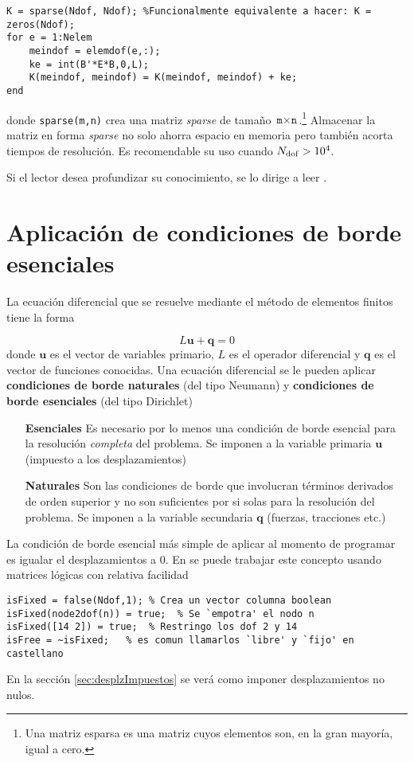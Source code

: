 \begin{lstlisting}[caption = {Obtención generica de matriz de rigidez.}]
K = sparse(Ndof, Ndof); %Funcionalmente equivalente a hacer: K = zeros(Ndof);
for e = 1:Nelem
	meindof = elemdof(e,:);
	ke = int(B'*E*B,0,L);
	K(meindof, meindof) = K(meindof, meindof) + ke;
end
\end{lstlisting}

donde \texttt{sparse(m,n)} crea una matriz \textit{sparse} de tamaño $\texttt{m}\times\texttt{n}$.\footnote{Una matriz esparsa es una matriz cuyos elementos son, en la gran mayoría, igual a cero.} Almacenar la matriz en forma \textit{sparse} no solo ahorra espacio en memoria pero también acorta tiempos de resolución. Es recomendable su uso cuando $N_{\mathrm{dof}}>10^4$.

Si el lector desea profundizar su conocimiento, se lo dirige a leer \citet{chessa2002programing}.


\section{Aplicación de condiciones de borde esenciales} \label{sec:condBordeEsenciales}
La ecuación diferencial que se resuelve mediante el método de elementos finitos tiene la forma

\begin{equation}  \label{eq:condBordeGeneralizada}
L\mathbf{u}+\mathbf{q}=0
\end{equation}
donde $\mathbf{u}$ es el vector de variables primario, $L$ es el operador diferencial y $\mathbf{q}$ es el vector de funciones conocidas. Una ecuación diferencial se le pueden aplicar \textbf{condiciones de borde naturales} (del tipo Neumann) y \textbf{condiciones de borde esenciales} (del tipo Dirichlet) \citep{dixit2007finite}
\begin{enumerate}
	\item[\textbf{Esenciales}] Es necesario por lo menos una condición de borde esencial para la resolución \textit{completa} del problema. Se imponen a la variable primaria $\mathbf{u}$ (impuesto a los desplazamientos)
	\item[\textbf{Naturales}] Son las condiciones de borde que involucran términos derivados de orden superior y no son suficientes por si solas para la resolución del problema. Se imponen a la variable secundaria $\mathbf{q}$ (fuerzas, tracciones etc.)
\end{enumerate}

La condición de borde esencial más simple de aplicar al momento de programar es igualar el desplazamientos a 0. En \Matlab{} se puede trabajar este concepto usando matrices lógicas con relativa facilidad
\begin{lstlisting}[caption = {Aplicación de condiciones de borde esenciales.}]
isFixed = false(Ndof,1); % Crea un vector columna boolean
isFixed(node2dof(n)) = true;  % Se `empotra' el nodo n
isFixed([14 2]) = true;  % Restringo los dof 2 y 14
isFree = ~isFixed;   % es comun llamarlos `libre' y `fijo' en castellano
\end{lstlisting}
En la sección \ref{sec:desplzImpuestos} se verá como imponer desplazamientos no nulos.

